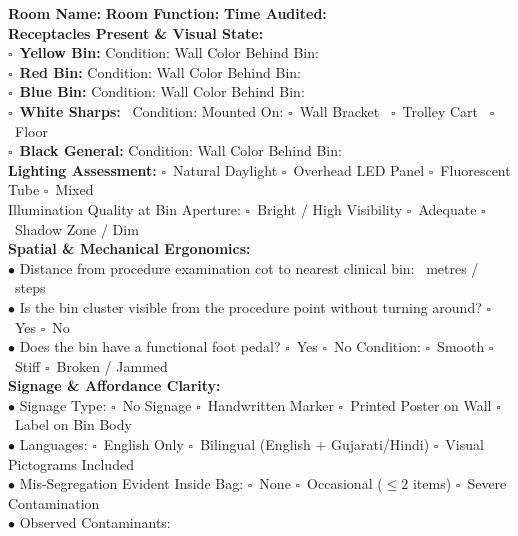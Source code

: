 \documentclass[11pt,a4paper]{article}
\newcommand{\checkbox}{$\square$\ }
\begin{document}
\begin{infobox}
\small
\noindent\textbf{Room Name:} \hrulefill \quad \textbf{Room Function:} \hrulefill \quad \textbf{Time Audited:} \hrulefill\\[4pt]
\textbf{Receptacles Present \& Visual State:}\\
\checkbox \textbf{Yellow Bin:} \quad Condition: \hrulefill \quad Wall Color Behind Bin: \hrulefill\\
\checkbox \textbf{Red Bin:} \quad\quad Condition: \hrulefill \quad Wall Color Behind Bin: \hrulefill\\
\checkbox \textbf{Blue Bin:} \quad\quad Condition: \hrulefill \quad Wall Color Behind Bin: \hrulefill\\
\checkbox \textbf{White Sharps:} \ Condition: \hrulefill \quad Mounted On: \checkbox Wall Bracket \ \checkbox Trolley Cart \ \checkbox Floor\\
\checkbox \textbf{Black General:} Condition: \hrulefill \quad Wall Color Behind Bin: \hrulefill\\[4pt]
\textbf{Lighting Assessment:} \checkbox Natural Daylight \quad \checkbox Overhead LED Panel \quad \checkbox Fluorescent Tube \quad \checkbox Mixed\\
Illumination Quality at Bin Aperture: \checkbox Bright / High Visibility \quad \checkbox Adequate \quad \checkbox Shadow Zone / Dim\\[4pt]
\textbf{Spatial \& Mechanical Ergonomics:}\\
$\bullet$ Distance from procedure examination cot to nearest clinical bin: \hrulefill\ metres / \hrulefill\ steps\\
$\bullet$ Is the bin cluster visible from the procedure point without turning around? \checkbox Yes \quad \checkbox No\\
$\bullet$ Does the bin have a functional foot pedal? \checkbox Yes \quad \checkbox No \quad Condition: \checkbox Smooth \quad \checkbox Stiff \quad \checkbox Broken / Jammed\\[4pt]
\textbf{Signage \& Affordance Clarity:}\\
$\bullet$ Signage Type: \checkbox No Signage \quad \checkbox Handwritten Marker \quad \checkbox Printed Poster on Wall \quad \checkbox Label on Bin Body\\
$\bullet$ Languages: \checkbox English Only \quad \checkbox Bilingual (English + Gujarati/Hindi) \quad \checkbox Visual Pictograms Included\\
$\bullet$ Mis-Segregation Evident Inside Bag: \checkbox None \quad \checkbox Occasional ($\le 2$ items) \quad \checkbox Severe Contamination\\
$\bullet$ Observed Contaminants: \hrulefill
\end{infobox}
\end{document}
